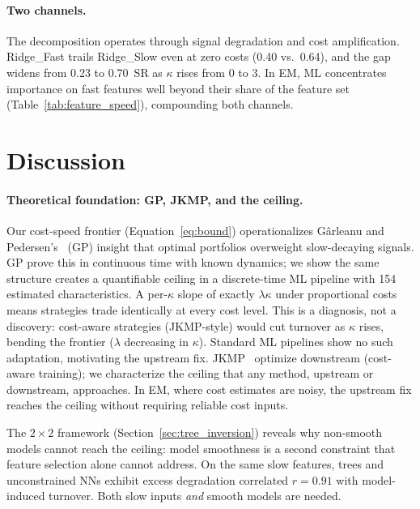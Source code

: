 \documentclass[sigconf,review,anonymous,balance=false]{acmart}
\begin{document}
\paragraph{Two channels.}
The decomposition operates through signal degradation and cost
amplification. Ridge\_Fast trails Ridge\_Slow even at zero costs
(0.40 vs.\ 0.64), and the gap widens from 0.23 to 0.70~SR as
$\kappa$ rises from 0 to 3. In EM, ML concentrates importance on fast
features well beyond their share of the feature set
(Table~\ref{tab:feature_speed}), compounding both channels.


\section{Discussion}

\paragraph{Theoretical foundation: GP, JKMP, and the ceiling.}
Our cost-speed frontier (Equation~\ref{eq:bound}) operationalizes
G\^{a}rleanu and Pedersen's~\cite{garleanu2013dynamic} (GP) insight
that optimal portfolios overweight slow-decaying signals. GP prove this
in continuous time with known dynamics; we show the same structure
creates a quantifiable ceiling in a discrete-time ML pipeline with
154 estimated characteristics. A per-$\kappa$ slope of exactly
$\lambda\kappa$ under proportional costs means strategies trade
identically at every cost level. This is a diagnosis, not a discovery:
cost-aware strategies (JKMP-style) would cut turnover as $\kappa$
rises, bending the frontier ($\lambda$ decreasing in $\kappa$).
Standard ML pipelines show no such adaptation, motivating the
upstream fix.
JKMP~\cite{jensen2024implementable} optimize downstream (cost-aware
training); we characterize the ceiling that any method, upstream or
downstream, approaches. In EM, where cost estimates are noisy, the
upstream fix reaches the ceiling without requiring reliable cost
inputs.

The $2 \times 2$ framework (Section~\ref{sec:tree_inversion}) reveals
why non-smooth models cannot reach the ceiling: model smoothness is a
second constraint that feature selection alone cannot address. On the
same slow features, trees and unconstrained NNs exhibit excess
degradation correlated $r = 0.91$ with model-induced turnover.
Both slow inputs \emph{and} smooth models are needed.
\end{document}
